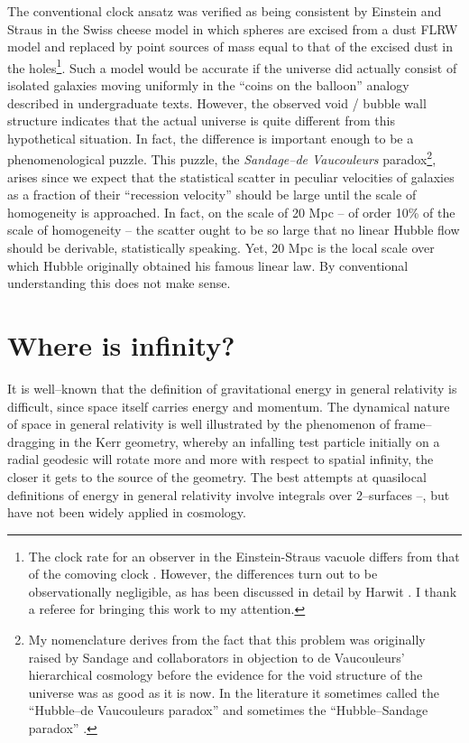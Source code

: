 \documentclass[12pt]{iopart}
\begin{document}
The conventional clock ansatz was verified as being consistent by Einstein
and Straus \cite{gruyere} in the Swiss cheese model in which spheres are
excised from a dust FLRW model and replaced by point sources of mass equal
to that of the excised dust in the holes\footnote{The clock rate for an
observer in the Einstein-Straus vacuole differs from that of the comoving
clock \cite{schu}. However, the differences turn out to be observationally
negligible, as has been discussed in detail by Harwit \cite{H}. I thank a
referee for bringing this work to my attention.}.
Such a model would be accurate if the universe did actually consist of
isolated galaxies moving uniformly in the ``coins on the balloon'' analogy
described in undergraduate texts. However,
the observed void / bubble wall structure indicates that the actual universe is
quite different from this hypothetical situation. In fact, the difference is
important enough to be a phenomenological puzzle. This puzzle, the
{\em Sandage--de Vaucouleurs} paradox\footnote{My nomenclature derives from
the fact that this problem was originally raised by Sandage and collaborators
\cite{STH} in objection to de Vaucouleurs' hierarchical cosmology \cite{deVau}
before the evidence for the void structure of the universe was as good as it
is now. In the literature it sometimes called the ``Hubble--de Vaucouleurs
paradox'' \cite{paradox1,bary} and sometimes the ``Hubble--Sandage paradox''
\cite{paradox2}.}, arises since we expect that the statistical scatter in
peculiar velocities of galaxies as a fraction of their ``recession velocity''
should be large until the scale of homogeneity is approached. In fact,
on the scale of 20 Mpc -- of order 10\% of the scale of homogeneity -- the
scatter ought to be so large that no linear Hubble flow should be derivable,
statistically speaking. Yet, 20 Mpc is the local scale over which Hubble
originally obtained his famous linear law. By conventional understanding this
does not make sense.

\section{Where is infinity?\label{infty}}

It is well--known that the definition of gravitational energy in general
relativity is difficult, since space itself carries energy and momentum.
The dynamical nature of space in general relativity is well illustrated by
the phenomenon of frame--dragging in the Kerr geometry, whereby an infalling
test particle initially on a radial geodesic will rotate more and more with
respect to spatial infinity, the closer it gets to the source of the
geometry. The best attempts at quasilocal definitions of energy in general
relativity involve integrals over 2--surfaces \cite{quasi_rev}--\cite{quasi2},
but have not been widely applied in cosmology.
\end{document}
